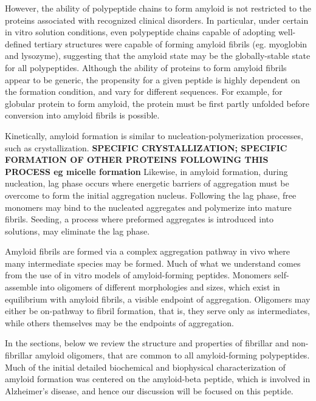 However, the ability of polypeptide chains to form amyloid is not restricted to the proteins associated with recognized clinical disorders. In particular, under certain in vitro solution conditions, even polypeptide chains capable of adopting well-defined tertiary structures were capable of forming amyloid fibrils (eg. myoglobin and lysozyme), suggesting that the amyloid state may be the globally-stable state for all polypeptides.  Although the ability of proteins to form amyloid fibrils appear to be generic, the propensity for a given peptide is highly dependent on the formation condition, and vary for different sequences. For example, for globular protein to form amyloid, the protein must be first partly unfolded before conversion into amyloid fibrils is possible.

Kinetically, amyloid formation is similar to nucleation-polymerization processes, such as crystallization. 
\textbf{SPECIFIC CRYSTALLIZATION; SPECIFIC FORMATION OF OTHER PROTEINS FOLLOWING THIS PROCESS eg micelle formation} Likewise, in amyloid formation, during nucleation, lag phase occurs where energetic barriers of aggregation must be overcome to form the initial aggregation nucleus. Following the lag phase, free monomers may bind to the nucleated aggregates and polymerize into mature fibrils.\cite{Murphy:2002fe} Seeding, a process where preformed aggregates is introduced into solutions, may eliminate the lag phase.\cite{harper and lansbury 1997, Jarrett and lansbury 1993}  

Amyloid fibrils are formed via a complex aggregation pathway in vivo where many intermediate species may be formed.  Much of what we understand comes from the use of in vitro models of amyloid-forming peptides. Monomers self-assemble into oligomers of different morphologies and sizes, which exist in equilibrium with amyloid fibrils, a visible endpoint of aggregation. Oligomers may either be on-pathway to fibril formation, that is, they serve only as intermediates, while others themselves may be the endpoints of aggregation.

In the sections, below we review the structure and properties of fibrillar and non-fibrillar amyloid oligomers, that are common to all amyloid-forming polypeptides.  Much of the initial detailed biochemical and biophysical characterization of amyloid formation was centered on the amyloid-beta peptide, which is involved in Alzheimer's disease, and hence our discussion will be focused on this peptide. %

